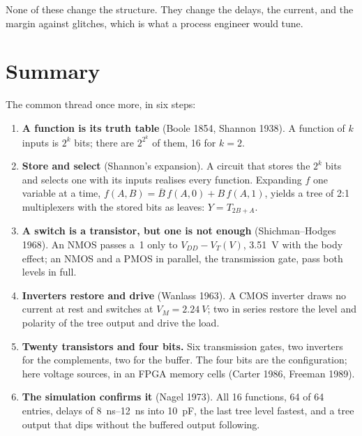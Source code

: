 \documentclass[11pt,a4paper]{article}
\newcommand{\VDD}{V_{DD}}
\newcommand{\VT}{V_{T}}
\newcommand{\ovl}[1]{\overline{#1}}
\begin{document}
None of these change the structure. They change the delays, the
current, and the margin against glitches, which is what a process
engineer would tune.

\section{Summary}
\label{sec:summary}

The common thread once more, in six steps:

\begin{enumerate}
    \item \textbf{A function is its truth table} (Boole 1854, Shannon
          1938). A function of $k$ inputs is $2^k$ bits; there are
          $2^{2^k}$ of them, 16 for $k=2$.
    \item \textbf{Store and select} (Shannon's expansion). A circuit
          that stores the $2^k$ bits and selects one with its inputs
          realises every function. Expanding $f$ one variable at a
          time, $f(A,B)=\ovl B\,f(A,0)+B\,f(A,1)$, yields a tree of
          2:1 multiplexers with the stored bits as leaves:
          $Y=T_{2B+A}$.
    \item \textbf{A switch is a transistor, but one is not enough}
          (Shichman--Hodges 1968). An NMOS passes a~1 only to
          $\VDD-\VT(V)$, \SI{3.51}{V} with the body effect; an NMOS
          and a PMOS in parallel, the transmission gate, pass both
          levels in full.
    \item \textbf{Inverters restore and drive} (Wanlass 1963). A CMOS
          inverter draws no current at rest and switches at
          $V_M=\SI{2.24}{V}$; two in series restore the level and
          polarity of the tree output and drive the load.
    \item \textbf{Twenty transistors and four bits.} Six transmission
          gates, two inverters for the complements, two for the
          buffer. The four bits are the configuration; here voltage
          sources, in an FPGA memory cells (Carter 1986, Freeman 1989).
    \item \textbf{The simulation confirms it} (Nagel 1973). All 16
          functions, 64 of 64 entries, delays of \SIrange{8}{12}{ns}
          into \SI{10}{pF}, the last tree level fastest, and a tree
          output that dips without the buffered output following.
\end{enumerate}
\end{document}
